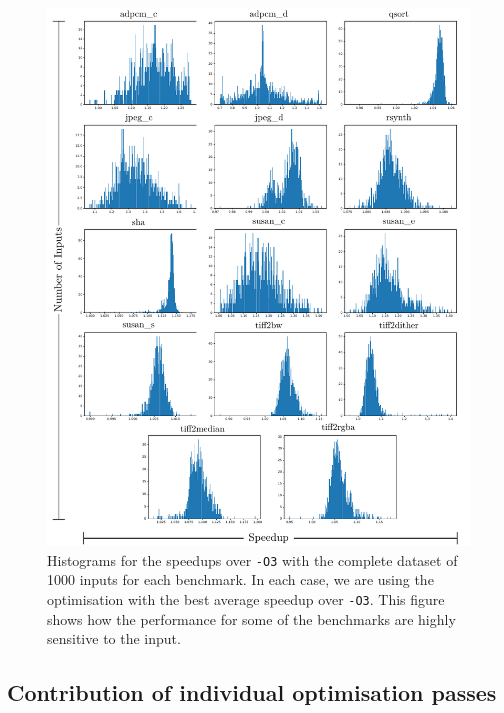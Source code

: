 \begin{figure}[h!]
    \centering
    \includegraphics[width=\textwidth]{figs/speedups-per-input.pdf}
    \caption{Histograms for the speedups over \texttt{-O3} with the complete dataset of 1000 inputs for each benchmark.
             In each case, we are using the optimisation with the best average speedup over \texttt{-O3}.
             This figure shows how the performance for some of the benchmarks are highly sensitive to the input.}
    \label{fig:speedups-per-input}
\end{figure}


\subsection{Contribution of individual optimisation passes}

